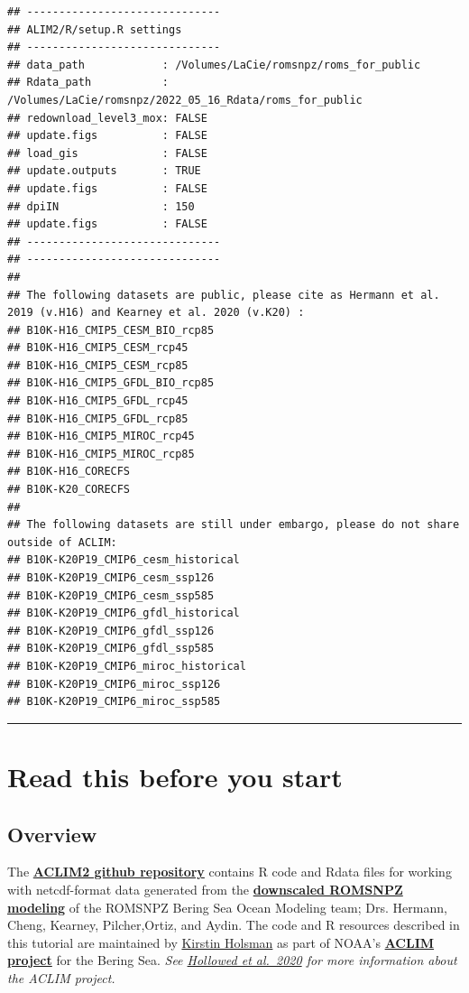 \documentclass[
]{article}
\begin{document}
\begin{verbatim}
## ------------------------------
## ALIM2/R/setup.R settings 
## ------------------------------
## data_path            : /Volumes/LaCie/romsnpz/roms_for_public 
## Rdata_path           : /Volumes/LaCie/romsnpz/2022_05_16_Rdata/roms_for_public 
## redownload_level3_mox: FALSE 
## update.figs          : FALSE 
## load_gis             : FALSE 
## update.outputs       : TRUE 
## update.figs          : FALSE 
## dpiIN                : 150 
## update.figs          : FALSE 
## ------------------------------
## ------------------------------
## 
## The following datasets are public, please cite as Hermann et al. 2019 (v.H16) and Kearney et al. 2020 (v.K20) :
## B10K-H16_CMIP5_CESM_BIO_rcp85 
## B10K-H16_CMIP5_CESM_rcp45 
## B10K-H16_CMIP5_CESM_rcp85 
## B10K-H16_CMIP5_GFDL_BIO_rcp85 
## B10K-H16_CMIP5_GFDL_rcp45 
## B10K-H16_CMIP5_GFDL_rcp85 
## B10K-H16_CMIP5_MIROC_rcp45 
## B10K-H16_CMIP5_MIROC_rcp85 
## B10K-H16_CORECFS 
## B10K-K20_CORECFS 
## 
## The following datasets are still under embargo, please do not share outside of ACLIM:
## B10K-K20P19_CMIP6_cesm_historical 
## B10K-K20P19_CMIP6_cesm_ssp126 
## B10K-K20P19_CMIP6_cesm_ssp585 
## B10K-K20P19_CMIP6_gfdl_historical 
## B10K-K20P19_CMIP6_gfdl_ssp126 
## B10K-K20P19_CMIP6_gfdl_ssp585 
## B10K-K20P19_CMIP6_miroc_historical 
## B10K-K20P19_CMIP6_miroc_ssp126 
## B10K-K20P19_CMIP6_miroc_ssp585
\end{verbatim}

\begin{center}\rule{0.5\linewidth}{0.5pt}\end{center}

\hypertarget{read-this-before-you-start}{%
\section{Read this before you start}\label{read-this-before-you-start}}

\hypertarget{overview}{%
\subsection{Overview}\label{overview}}

The \href{https://github.com/kholsman/ACLIM2}{\textbf{ACLIM2 github
repository}} contains R code and Rdata files for working with
netcdf-format data generated from the
\href{https://beringnpz.github.io/roms-bering-sea}{\textbf{downscaled
ROMSNPZ modeling}} of the ROMSNPZ Bering Sea Ocean Modeling team; Drs.
Hermann, Cheng, Kearney, Pilcher,Ortiz, and Aydin. The code and R
resources described in this tutorial are maintained by
\href{mailto:kirstin.holsman@noaa.gov}{Kirstin Holsman} as part of
NOAA's
\href{https://www.fisheries.noaa.gov/alaska/ecosystems/alaska-climate-integrated-modeling-project}{\textbf{ACLIM
project}} for the Bering Sea. \emph{See
\href{https://www.frontiersin.org/articles/10.3389/fmars.2019.00775/full}{Hollowed
et al.~2020} for more information about the ACLIM project.}
\end{document}

